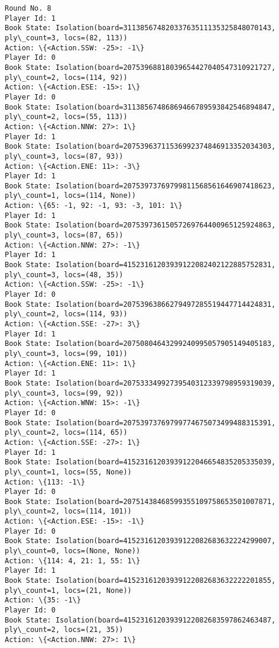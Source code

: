 \documentclass[11pt]{article}
\begin{document}
\begin{Verbatim}[commandchars=\\\{\}]
Round No. 8
Player Id: 1
Book State: Isolation(board=31138567482033763511135325848070143, ply\_count=3, locs=(82, 113))
Action: \{<Action.SSW: -25>: -1\}
Player Id: 0
Book State: Isolation(board=20753968818039654427040547310921727, ply\_count=2, locs=(114, 92))
Action: \{<Action.ESE: -15>: 1\}
Player Id: 0
Book State: Isolation(board=31138567486869466789593842546894847, ply\_count=2, locs=(55, 113))
Action: \{<Action.NNW: 27>: 1\}
Player Id: 1
Book State: Isolation(board=20753963711536992374846913352034303, ply\_count=3, locs=(87, 93))
Action: \{<Action.ENE: 11>: -3\}
Player Id: 1
Book State: Isolation(board=20753973769799811568561646907418623, ply\_count=1, locs=(114, None))
Action: \{65: -1, 92: -1, 93: -3, 101: 1\}
Player Id: 1
Book State: Isolation(board=20753973615057269764400965125924863, ply\_count=3, locs=(87, 65))
Action: \{<Action.NNW: 27>: -1\}
Player Id: 1
Book State: Isolation(board=41523161203939122082402122885752831, ply\_count=3, locs=(48, 35))
Action: \{<Action.SSW: -25>: -1\}
Player Id: 0
Book State: Isolation(board=20753963866279497285519447714424831, ply\_count=2, locs=(114, 93))
Action: \{<Action.SSE: -27>: 3\}
Player Id: 1
Book State: Isolation(board=20750804643299240995057905149405183, ply\_count=3, locs=(99, 101))
Action: \{<Action.ENE: 11>: 1\}
Player Id: 1
Book State: Isolation(board=20753334992739540312339798959319039, ply\_count=3, locs=(99, 92))
Action: \{<Action.WNW: 15>: -1\}
Player Id: 0
Book State: Isolation(board=20753973769799774675073499488315391, ply\_count=2, locs=(114, 65))
Action: \{<Action.SSE: -27>: 1\}
Player Id: 1
Book State: Isolation(board=41523161203939122046654835205335039, ply\_count=1, locs=(55, None))
Action: \{113: -1\}
Player Id: 0
Book State: Isolation(board=20751438468599355109758653501007871, ply\_count=2, locs=(114, 101))
Action: \{<Action.ESE: -15>: -1\}
Player Id: 0
Book State: Isolation(board=41523161203939122082683632224299007, ply\_count=0, locs=(None, None))
Action: \{114: 4, 21: 1, 55: 1\}
Player Id: 1
Book State: Isolation(board=41523161203939122082683632222201855, ply\_count=1, locs=(21, None))
Action: \{35: -1\}
Player Id: 0
Book State: Isolation(board=41523161203939122082683597862463487, ply\_count=2, locs=(21, 35))
Action: \{<Action.NNW: 27>: 1\}


\end{Verbatim}
\end{document}
